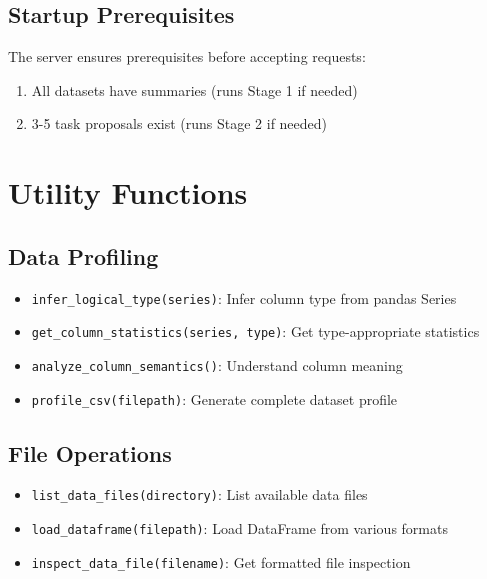 \documentclass[12pt,a4paper]{report}
\begin{document}
\section{Startup Prerequisites}
The server ensures prerequisites before accepting requests:
\begin{enumerate}
    \item All datasets have summaries (runs Stage 1 if needed)
    \item 3-5 task proposals exist (runs Stage 2 if needed)
\end{enumerate}

\chapter{Utility Functions}

\section{Data Profiling}
\begin{itemize}
    \item \texttt{infer\_logical\_type(series)}: Infer column type from pandas Series
    \item \texttt{get\_column\_statistics(series, type)}: Get type-appropriate statistics
    \item \texttt{analyze\_column\_semantics()}: Understand column meaning
    \item \texttt{profile\_csv(filepath)}: Generate complete dataset profile
\end{itemize}

\section{File Operations}
\begin{itemize}
    \item \texttt{list\_data\_files(directory)}: List available data files
    \item \texttt{load\_dataframe(filepath)}: Load DataFrame from various formats
    \item \texttt{inspect\_data\_file(filename)}: Get formatted file inspection
\end{itemize}
\end{document}
